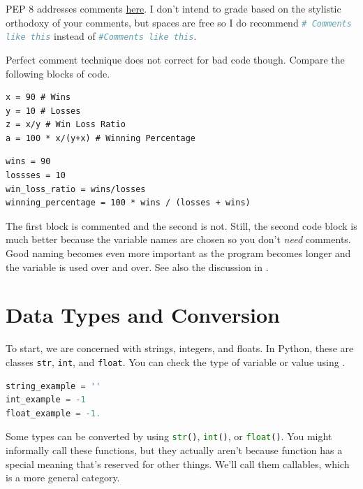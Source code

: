 \smallskip

 PEP 8 addresses comments \textcolor{blue}{\href{https://www.python.org/dev/peps/pep-0008/\#comments}{here}}.
I don't intend to grade based on the stylistic orthodoxy of your comments, but spaces are free so I do recommend 
\lstinline[language = Python]{# Comments like this} instead of \lstinline[language = Python]{#Comments like this}.

Perfect comment technique does not correct for bad code though. Compare the following blocks of code. 

\begin{lstlisting}
x = 90 # Wins
y = 10 # Losses
z = x/y # Win Loss Ratio
a = 100 * x/(y+x) # Winning Percentage
\end{lstlisting}

\begin{lstlisting}
wins = 90
lossses = 10
win_loss_ratio = wins/losses
winning_percentage = 100 * wins / (losses + wins)
\end{lstlisting}

The first block is commented and the second is not. Still, the second code block is much better because the variable names are chosen so you don't \emph{need} comments. Good naming becomes even more important as the program becomes longer and the variable is used over and over. See also the discussion in \cite{long2021}.



\section{Data Types and Conversion}

To start, we are concerned with strings, integers, and floats. In Python, these are classes 
\lstinline{str}, \lstinline{int}, and \lstinline{float}.
You can check the type of variable or value using .


\begin{lstlisting}[language = Python]
string_example = ''
int_example = -1
float_example = -1. \end{lstlisting}

\smallskip
 Some types can be converted by using \lstinline[language = Python]{str()},
\lstinline[language = Python]{int()}, or \lstinline[language = Python]{float()}. You might informally call these functions, but they actually aren't because function has a special meaning that's reserved for other things. We'll call them callables, which is a more general category. 



